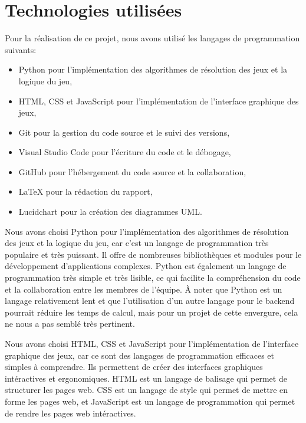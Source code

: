 \section{Technologies utilisées}

Pour la réalisation de ce projet, nous avons utilisé les langages de programmation suivants:
\begin{itemize}
	\item Python pour l'implémentation des algorithmes de résolution des jeux et la logique du jeu,
	\item HTML, CSS et JavaScript pour l'implémentation de l'interface graphique des jeux,
	\item Git pour la gestion du code source et le suivi des versions,
	\item Visual Studio Code pour l'écriture du code et le débogage,
	\item GitHub pour l'hébergement du code source et la collaboration,
	\item LaTeX pour la rédaction du rapport,
	\item Lucidchart pour la création des diagrammes UML.\@
\end{itemize}

Nous avons choisi Python pour l'implémentation des algorithmes de résolution des 
jeux et la logique du jeu, car c'est un langage de programmation très populaire et 
très puissant. Il offre de nombreuses bibliothèques et modules pour le 
développement d'applications complexes. 
Python est également un langage de programmation très simple et très lisible, 
ce qui facilite la compréhension du code et la collaboration entre les membres de 
l'équipe.
À noter que Python est un langage relativement lent et que l'utilisation d'un autre
langage pour le backend pourrait réduire les temps de calcul, mais pour un projet de cette envergure,
cela ne nous a pas semblé très pertinent.

Nous avons choisi HTML, CSS et JavaScript pour l'implémentation de l'interface
graphique des jeux, car ce sont des langages de programmation efficaces et 
simples à comprendre. Ils permettent de créer des interfaces graphiques intéractives 
et ergonomiques. HTML est un langage de balisage qui permet de structurer les pages
web. CSS est un langage de style qui permet de mettre en forme les pages web, et
JavaScript est un langage de programmation qui permet de rendre les pages web
intéractives.

